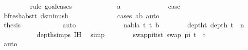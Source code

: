 \begin{isabellebody}
\ \ \ \ \ \ \ \ \isamarkupfalse%
{\isacharparenleft}{\kern0pt}rule{\isacharcomma}{\kern0pt}\ goal{\isacharunderscore}{\kern0pt}cases{\isacharparenright}{\kern0pt}\isanewline
\ \ \ \ \ \ \ \ \ \ \isamarkupfalse%
\ {\isacharparenleft}{\kern0pt}{}\ a{\isacharparenright}{\kern0pt}\isanewline
\ \ \ \ \ \ \ \ \ \ \isamarkupfalse%
\ \isamarkupfalse%
\ {\isacharquery}{\kern0pt}case\isanewline
\ \ \ \ \ \ \ \ \ \ \ \ \isamarkupfalse%
\ b{\isacharunderscore}{\kern0pt}fresh{\isacharunderscore}{\kern0pt}abst{\isacharunderscore}{\kern0pt}t{}\ ds{\isacharunderscore}{\kern0pt}minus{\isacharunderscore}{\kern0pt}b\isanewline
\ \ \ \ \ \ \ \ \ \ \ \ \isamarkupfalse%
\ {\isacharparenleft}{\kern0pt}cases\ {\isachardoublequoteopen}a{\isacharequal}{\kern0pt}b{\isachardoublequoteclose}{\isacharcomma}{\kern0pt}\ auto{\isacharparenright}{\kern0pt}\isanewline
\ \ \ \ \ \ \ \ \isamarkupfalse%
\isanewline
\ \ \ \ \ \ \ \ \isamarkupfalse%
\ {}\ \isamarkupfalse%
\ {\isacharquery}{\kern0pt}thesis\isanewline
\ \ \ \ \ \ \ \ \ \ \isamarkupfalse%
\ auto\isanewline
\ \ \ \ \isamarkupfalse%
\isanewline
\ \ \ \ \ \ \isamarkupfalse%
\ {\isacharparenleft}{\kern0pt}{}\ nabla\ t{}\ t{}\ b{\isacharparenright}{\kern0pt}\isanewline
\ \ \ \ \ \ \isamarkupfalse%
\ deptht{}{\isacharcolon}{\kern0pt}\ {\isachardoublequoteopen}depth\ t{}\ {\isacharless}{\kern0pt}\ n{\isachardoublequoteclose}\isanewline
\ \ \ \ \ \ \ \ \isamarkupfalse%
\ {}\ depth{\isachardot}{\kern0pt}simps{\isacharparenleft}{\kern0pt}{}{\isacharparenright}{\kern0pt}\ IH\ \isamarkupfalse%
\ simp\isanewline
\ \ \ \ \ \ \isamarkupfalse%
\ swap{\isacharunderscore}{\kern0pt}pi{\isacharunderscore}{\kern0pt}t{}{\isacharunderscore}{\kern0pt}is{\isacharunderscore}{\kern0pt}t{}{\isacharcolon}{\kern0pt}\ {\isachardoublequoteopen}swap\ pi\ t{}\ {\isacharequal}{\kern0pt}\ t{}{\isachardoublequoteclose}\isanewline
\ \ \ \ \ \ \ \ \isamarkupfalse%
\ {}{\isacharparenleft}{\kern0pt}{}{\isacharcomma}{\kern0pt}{}{\isacharparenright}{\kern0pt}\ \isamarkupfalse%
\ auto\isanewline
\ \ \ \ \ \ \isamarkupfalse%

\end{isabellebody}
